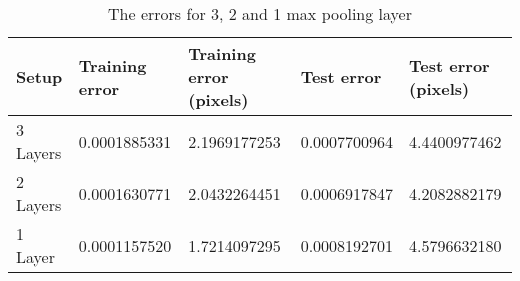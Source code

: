 \begin{table}[h!]
\centering
\footnotesize
\begin{tabular}{|l|l|l|l|l|}
	\hline
		\textbf{Setup} & \textbf{Training error} & \textbf{Training error (pixels)} & \textbf{Test error} & \textbf{Test error (pixels)}\\
	\hline
		3 Layers 	& 0.0001885331%
					& 2.1969177253%
					& 0.0007700964%
					& 4.4400977462%
					\\
	\hline
		2 Layers	& 0.0001630771%
					& 2.0432264451%
					& 0.0006917847%
					& 4.2082882179%
					\\
	\hline
		1 Layer		& 0.0001157520%
					& 1.7214097295%
					& 0.0008192701%
					& 4.5796632180%
					\\
	\hline
	\end{tabular}
	\normalsize
	\caption{The errors for 3, 2 and 1 max pooling layer}
	\label{tab:cnn_errors_maxpooling}
\end{table}

